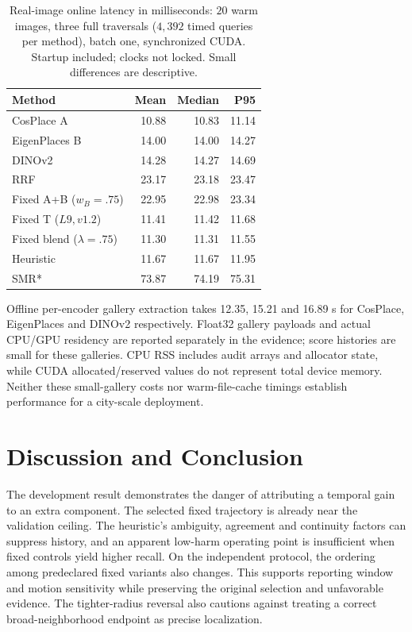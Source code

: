 \documentclass[conference]{IEEEtran}
\begin{document}
\begin{table}[t]\centering\small
\caption{Real-image online latency in milliseconds: $20$ warm images, three full traversals ($4,392$ timed queries per method), batch one, synchronized CUDA. Startup included; clocks not locked. Small differences are descriptive.}\label{tab:latency}
\begin{tabular}{lrrr}\toprule Method & Mean & Median & P95\\\midrule
CosPlace A & 10.88 & 10.83 & 11.14\\
EigenPlaces B & 14.00 & 14.00 & 14.27\\
DINOv2 & 14.28 & 14.27 & 14.69\\
RRF & 23.17 & 23.18 & 23.47\\
Fixed A+B ($w_B=.75$) & 22.95 & 22.98 & 23.34\\
Fixed T ($L9,v1.2$) & 11.41 & 11.42 & 11.68\\
Fixed blend ($\lambda=.75$) & 11.30 & 11.31 & 11.55\\
Heuristic & 11.67 & 11.67 & 11.95\\
SMR* & 73.87 & 74.19 & 75.31\\
\bottomrule\end{tabular}\end{table}

Offline per-encoder gallery extraction takes 12.35, 15.21 and 16.89 s for CosPlace, EigenPlaces and DINOv2 respectively. Float32 gallery payloads and actual CPU/GPU residency are reported separately in the evidence; score histories are small for these galleries. CPU RSS includes audit arrays and allocator state, while CUDA allocated/reserved values do not represent total device memory. Neither these small-gallery costs nor warm-file-cache timings establish performance for a city-scale deployment.

\section{Discussion and Conclusion}
The development result demonstrates the danger of attributing a temporal gain to an extra component. The selected fixed trajectory is already near the validation ceiling. The heuristic's ambiguity, agreement and continuity factors can suppress history, and an apparent low-harm operating point is insufficient when fixed controls yield higher recall. On the independent protocol, the ordering among predeclared fixed variants also changes. This supports reporting window and motion sensitivity while preserving the original selection and unfavorable evidence. The tighter-radius reversal also cautions against treating a correct broad-neighborhood endpoint as precise localization.
\end{document}
